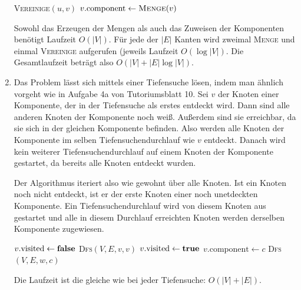 \documentclass[11pt,a4paper]{article}
\begin{document}
\begin{loesung}
\begin{enumerate}
\begin{algorithmic}[1]
                        \State \textsc{Vereinige}$(u, v)$
                    \EndIf
                \EndFor
                    \State $v.\mathrm{component} \gets \text{\textsc{Menge}}(v)$
                \EndFor
            \EndProcedure
        \end{algorithmic}
        Sowohl das Erzeugen der Mengen als auch das Zuweisen der Komponenten benötigt Laufzeit $O(|V|)$.
        Für jede der $|E|$ Kanten wird zweimal \textsc{Menge} und einmal \textsc{Vereinige} aufgerufen (jeweils Laufzeit $O(\log |V|)$.
        Die Gesamtlaufzeit beträgt also $O(|V| + |E| \log |V|)$.

        \item Das Problem lässt sich mittels einer Tiefensuche lösen, indem man ähnlich vorgeht wie in Aufgabe 4a von Tutoriumsblatt 10.
        Sei $v$ der Knoten einer Komponente, der in der Tiefensuche als erstes entdeckt wird.
        Dann sind alle anderen Knoten der Komponente noch weiß.
        Außerdem sind sie erreichbar, da sie sich in der gleichen Komponente befinden.
        Also werden alle Knoten der Komponente im selben Tiefensuchendurchlauf wie $v$ entdeckt.
        Danach wird kein weiterer Tiefensuchendurchlauf auf einem Knoten der Komponente gestartet, da bereits alle Knoten entdeckt wurden.

        Der Algorithmus iteriert also wie gewohnt über alle Knoten.
        Ist ein Knoten noch nicht entdeckt, ist er der erste Knoten einer noch unetdeckten Komponente.
        Ein Tiefensuchendurchlauf wird von diesem Knoten aus gestartet und alle in diesem Durchlauf erreichten Knoten werden derselben Komponente zugewiesen.
        \begin{algorithmic}[1]
                    \State $v.\mathrm{visited} \gets \text{\textbf{false}}$
                \EndFor
                        \State \textsc{Dfs}$(V, E, v, v)$
                    \EndIf
                \EndFor
            \EndProcedure
                \State $v.\mathrm{visited} \gets \text{\textbf{true}}$
                \State $v.\mathrm{component} \gets c$
                        \State \textsc{Dfs}$(V, E, w, c)$
                    \EndIf
                \EndFor
            \EndProcedure
        \end{algorithmic}
        Die Laufzeit ist die gleiche wie bei jeder Tiefensuche: $O(|V| + |E|)$.
    \end{enumerate}
\end{loesung}
\end{document}
